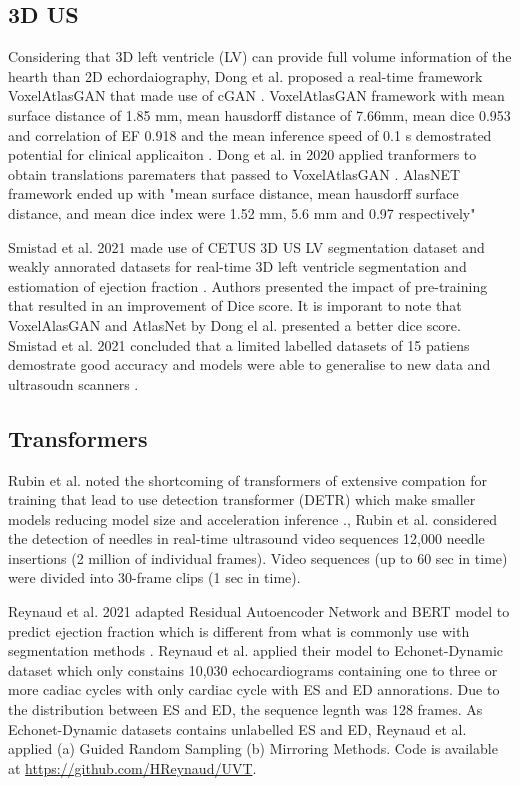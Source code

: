 \subsection{3D US}
Considering that 3D left ventricle (LV) can provide full volume information of the hearth than 2D echordaiography,  Dong et al. proposed a real-time framework VoxelAtlasGAN that made use of cGAN \cite{dong2018-MICCAI}. 
VoxelAtlasGAN framework with mean surface distance of 1.85 mm, mean hausdorff distance of 7.66mm, mean dice 0.953 and correlation of EF 0.918 and the mean inference speed of 0.1 s demostrated potential for clinical applicaiton \cite{dong2018-MICCAI}.
Dong et al. in 2020 applied tranformers to obtain translations parematers that passed to VoxelAtlasGAN \cite{dong2020-MIA}.
AlasNET framework  ended up with "mean surface distance, mean hausdorff surface distance, and mean dice index were 1.52 mm, 5.6 mm and 0.97 respectively" \cite{dong2020-MIA}

Smistad et al. 2021 made use of CETUS 3D US LV segmentation dataset and weakly annorated datasets for real-time 3D left ventricle segmentation and estiomation of ejection fraction \cite{smistad2021-D-IUS}.
Authors presented the impact of pre-training that resulted in an improvement of Dice score. 
It is imporant to note that VoxelAlasGAN and AtlasNet by Dong el al. presented a better dice score.
Smistad et al. 2021 concluded that a limited labelled datasets of 15 patiens demostrate good accuracy and models were able to generalise to new data and ultrasoudn scanners \cite{smistad2021-D-IUS}.




\subsection{Transformers}

Rubin et al. noted the shortcoming of transformers of extensive compation for training that lead to use detection transformer (DETR) which make smaller models reducing model size and acceleration inference \cite{rubin2021-PMLH}.,
Rubin et al. considered the detection of needles in real-time ultrasound video sequences 12,000 needle insertions (2 million of individual frames).
Video sequences (up to 60 sec in time) were divided into 30-frame clips (1 sec in time).


Reynaud et al. 2021 adapted Residual Autoencoder Network and BERT model to predict ejection fraction which is different from what is commonly use with segmentation methods \cite{reynaud2021-MICCAI}.
Reynaud et al. applied their model to Echonet-Dynamic dataset which only constains 10,030 echocardiograms containing one to three or more cadiac cycles with only cardiac cycle with ES and ED annorations.
Due to the distribution between ES and ED, the sequence legnth was 128 frames.
As Echonet-Dynamic datasets contains unlabelled ES and ED, Reynaud et al. applied (a) Guided Random Sampling (b) Mirroring Methods.
Code is available at \url{https://github.com/HReynaud/UVT}.



